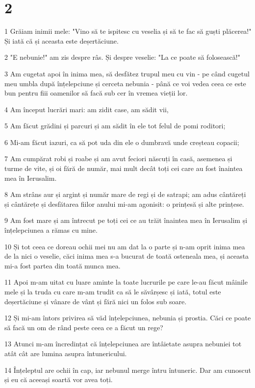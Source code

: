 \chapter{2}

\par 1 Grăiam inimii mele: "Vino să te ispitesc cu veselia și să te fac să guști plăcerea!" Și iată că și aceasta este deșertăciune.
\par 2 "E nebunie!" am zis despre râs. Și despre veselie: "La ce poate să folosească!"
\par 3 Am cugetat apoi în inima mea, să desfătez trupul meu cu vin - pe când cugetul meu umbla după înțelepciune și cerceta nebunia - până ce voi vedea ceea ce este bun pentru fiii oamenilor să facă sub cer în vremea vieții lor.
\par 4 Am început lucrări mari: am zidit case, am sădit vii,
\par 5 Am făcut grădini și parcuri și am sădit în ele tot felul de pomi roditori;
\par 6 Mi-am făcut iazuri, ca să pot uda din ele o dumbravă unde creșteau copacii;
\par 7 Am cumpărat robi și roabe și am avut feciori născuți în casă, asemenea și turme de vite, și oi fără de număr, mai mult decât toți cei care au fost înaintea mea în Ierusalim.
\par 8 Am strâns aur și argint și număr mare de regi și de satrapi; am adus cântăreți și cântărețe și desfătarea fiilor anului mi-am agonisit: o prințesă și alte prințese.
\par 9 Am fost mare și am întrecut pe toți cei ce au trăit înaintea mea în Ierusalim și înțelepciunea a rămas cu mine.
\par 10 Și tot ceea ce doreau ochii mei nu am dat la o parte și n-am oprit inima mea de la nici o veselie, căci inima mea s-a bucurat de toată osteneala mea, și aceasta mi-a fost partea din toată munca mea.
\par 11 Apoi m-am uitat cu luare aminte la toate lucrurile pe care le-au făcut mâinile mele și la truda cu care m-am trudit ca să le săvârșesc și iată, totul este deșertăciune și vânare de vânt și fără nici un folos sub soare.
\par 12 Și mi-am întors privirea să văd înțelepciunea, nebunia și prostia. Căci ce poate să facă un om de rând peste ceea ce a făcut un rege?
\par 13 Atunci m-am încredințat că înțelepciunea are întâietate asupra nebuniei tot atât cât are lumina asupra întunericului.
\par 14 Înțeleptul are ochii în cap, iar nebunul merge întru întuneric. Dar am cunoscut și eu că aceeași soartă vor avea toți.
